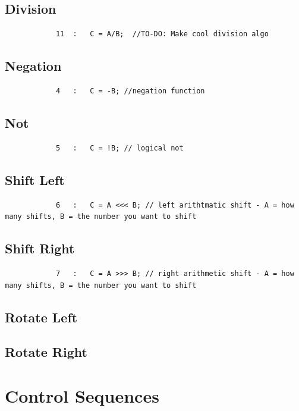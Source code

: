 \documentclass{article}
\begin{document}
    \subsection{Division}
        \begin{lstlisting}
            11  :   C = A/B;  //TO-DO: Make cool division algo
        \end{lstlisting}
    \subsection{Negation}
        \begin{lstlisting}
            4   :   C = -B; //negation function
        \end{lstlisting}
    \subsection{Not}
        \begin{lstlisting}
            5   :   C = !B; // logical not 
        \end{lstlisting}
    \subsection{Shift Left}
        \begin{lstlisting}
            6   :   C = A <<< B; // left arithtmatic shift - A = how many shifts, B = the number you want to shift 
        \end{lstlisting}
    \subsection{Shift Right}
        \begin{lstlisting}
            7   :   C = A >>> B; // right arithmetic shift - A = how many shifts, B = the number you want to shift 
        \end{lstlisting}
    \subsection{Rotate Left}
        
    \subsection{Rotate Right}
        
\section{Control Sequences}
\end{document}
